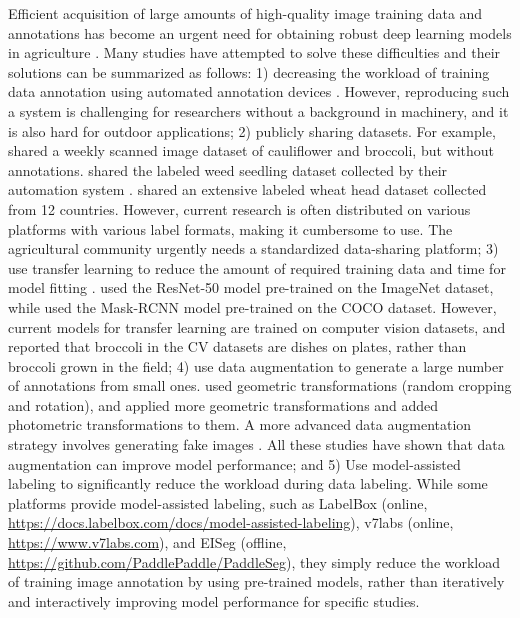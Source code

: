 Efficient acquisition of large amounts of high-quality image training data and annotations has become an urgent need for obtaining robust deep learning models in agriculture \citep{yang_applications_2021}. Many studies have attempted to solve these difficulties and their solutions can be summarized as follows: 1) decreasing the workload of training data annotation using automated annotation devices \citep{beck_embedded_2020}. However, reproducing such a system is challenging for researchers without a background in machinery, and it is also hard for outdoor applications; 2) publicly sharing datasets. For example, \citet{bender_ladybird_2019} shared a weekly scanned image dataset of cauliflower and broccoli, but without annotations. \citet{beck_weed_2020} shared the labeled weed seedling dataset collected by their automation system \citep{beck_embedded_2020}. \citet{david_global_2021} shared an extensive labeled wheat head dataset collected from 12 countries. However, current research is often distributed on various platforms with various label formats, making it cumbersome to use. The agricultural community urgently needs a standardized data-sharing platform; 3) use transfer learning to reduce the amount of required training data and time for model fitting \citep{yang_applications_2021}. \cite{desai_automatic_2019} used the ResNet-50 model pre-trained on the ImageNet dataset, while \citet{blok_effect_2021} used the Mask-RCNN model pre-trained on the COCO dataset. However, current models for transfer learning are trained on computer vision datasets, and \cite{blok_effect_2021} reported that broccoli in the CV datasets are dishes on plates, rather than broccoli grown in the field; 4) use data augmentation to generate a large number of annotations from small ones. \citet{zhou_monitoring_2020} used geometric transformations (random cropping and rotation), and \citet{blok_effect_2021} applied more geometric transformations and added photometric transformations to them. A more advanced data augmentation strategy involves generating fake images \citep{nesteruk_image_2021}. All these studies have shown that data augmentation can improve model performance; and 5) Use model-assisted labeling to significantly reduce the workload during data labeling. While some platforms provide model-assisted labeling, such as LabelBox (online, \url{https://docs.labelbox.com/docs/model-assisted-labeling}), v7labs (online, \url{https://www.v7labs.com}), and EISeg (offline, \url{https://github.com/PaddlePaddle/PaddleSeg}), they simply reduce the workload of training image annotation by using pre-trained models, rather than iteratively and interactively improving model performance for specific studies.

